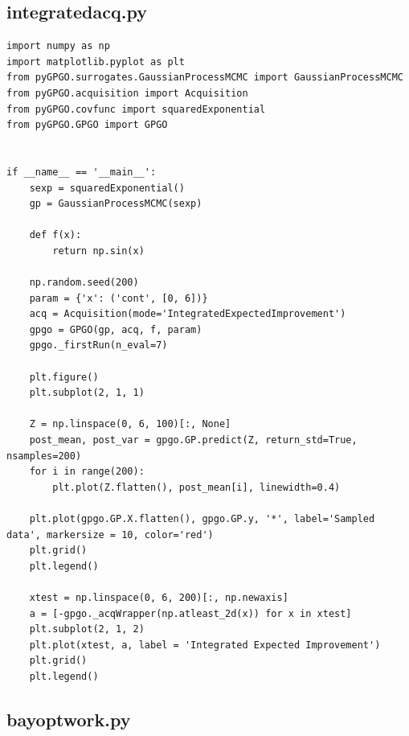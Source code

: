 \documentclass[10pt,a4paper,twoside]{book}
\begin{document}
\subsection*{integratedacq.py}
\label{integratedacq}
\begin{verbatim}
import numpy as np
import matplotlib.pyplot as plt
from pyGPGO.surrogates.GaussianProcessMCMC import GaussianProcessMCMC
from pyGPGO.acquisition import Acquisition
from pyGPGO.covfunc import squaredExponential
from pyGPGO.GPGO import GPGO


if __name__ == '__main__':
    sexp = squaredExponential()
    gp = GaussianProcessMCMC(sexp)

    def f(x):
        return np.sin(x)

    np.random.seed(200)
    param = {'x': ('cont', [0, 6])}
    acq = Acquisition(mode='IntegratedExpectedImprovement')
    gpgo = GPGO(gp, acq, f, param)
    gpgo._firstRun(n_eval=7)

    plt.figure()
    plt.subplot(2, 1, 1)

    Z = np.linspace(0, 6, 100)[:, None]
    post_mean, post_var = gpgo.GP.predict(Z, return_std=True, nsamples=200)
    for i in range(200):
        plt.plot(Z.flatten(), post_mean[i], linewidth=0.4)

    plt.plot(gpgo.GP.X.flatten(), gpgo.GP.y, '*', label='Sampled data', markersize = 10, color='red')
    plt.grid()
    plt.legend()

    xtest = np.linspace(0, 6, 200)[:, np.newaxis]
    a = [-gpgo._acqWrapper(np.atleast_2d(x)) for x in xtest]
    plt.subplot(2, 1, 2)
    plt.plot(xtest, a, label = 'Integrated Expected Improvement')
    plt.grid()
    plt.legend()               
\end{verbatim}


\subsection*{bayoptwork.py}
\label{bayoptwork}
\end{document}
